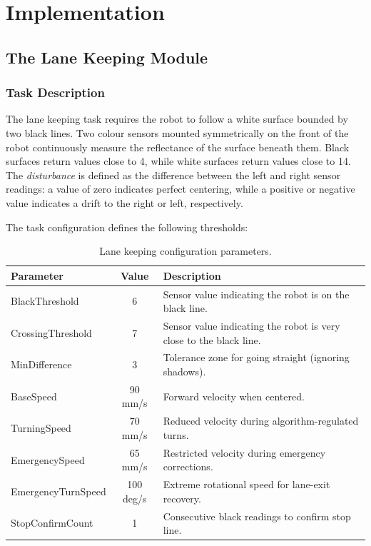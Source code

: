 \chapter{Implementation}
\label{ch:implementation}

\section{The Lane Keeping Module}
\label{sec:lane-keeping}

\subsection{Task Description}
\label{sec:lk-task}

The lane keeping task requires the robot to follow a white surface bounded by two black lines. Two colour sensors mounted symmetrically on the front of the robot continuously measure the reflectance of the surface beneath them. Black surfaces return values close to 4, while white surfaces return values close to 14. The \textit{disturbance} is defined as the difference between the left and right sensor readings: a value of zero indicates perfect centering, while a positive or negative value indicates a drift to the right or left, respectively.

The task configuration defines the following thresholds:

\begin{table}[htbp]
\centering
\caption{Lane keeping configuration parameters.}
\label{tab:lk-config}
\begin{tabular}{l c p{7cm}}
\hline
\textbf{Parameter} & \textbf{Value} & \textbf{Description} \\
\hline
BlackThreshold      & 6       & Sensor value indicating the robot is on the black line. \\
CrossingThreshold   & 7       & Sensor value indicating the robot is very close to the black line. \\
MinDifference       & 3       & Tolerance zone for going straight (ignoring shadows). \\
BaseSpeed           & 90 mm/s & Forward velocity when centered. \\
TurningSpeed        & 70 mm/s & Reduced velocity during algorithm-regulated turns. \\
EmergencySpeed      & 65 mm/s & Restricted velocity during emergency corrections. \\
EmergencyTurnSpeed  & 100 deg/s & Extreme rotational speed for lane-exit recovery. \\
StopConfirmCount    & 1       & Consecutive black readings to confirm stop line. \\
\hline
\end{tabular}
\end{table}

